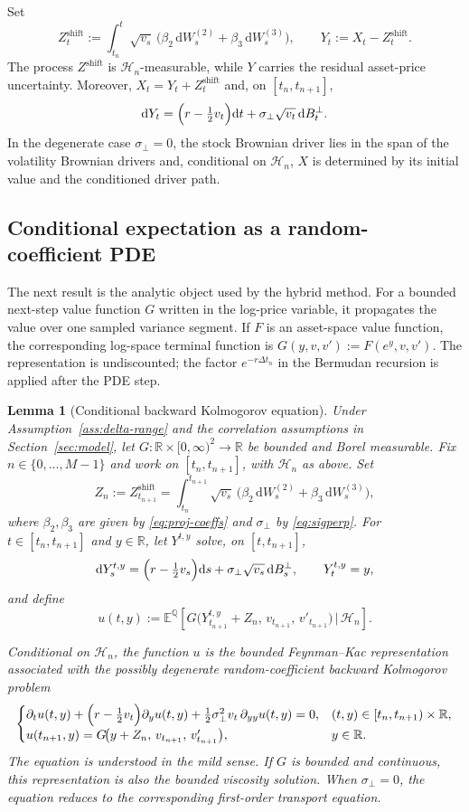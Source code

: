 \documentclass[10pt]{article}
\theoremstyle{plain}
\newtheorem{lemma}[theorem]{Lemma}
\theoremstyle{definition}
\theoremstyle{remark}
\newcommand{\dd}{\mathrm d}
\newcommand{\E}{\mathbb E}
\newcommand{\Q}{\mathbb Q}
\newcommand{\R}{\mathbb R}
\begin{document}
Set
\[
Z^{\mathrm{shift}}_t:=\int_{t_n}^t \sqrt{v_s}\,\bigl(\beta_2\,\dd W^{(2)}_s+\beta_3\,\dd W^{(3)}_s\bigr),
\qquad
Y_t:=X_t-Z^{\mathrm{shift}}_t.
\]
The process $Z^{\mathrm{shift}}$ is $\mathcal H_n$-measurable, while $Y$ carries the residual asset-price
uncertainty. Moreover, $X_t=Y_t+Z^{\mathrm{shift}}_t$ and, on $[t_n,t_{n+1}]$,
\[
\dd Y_t=\Bigl(r-\tfrac12 v_t\Bigr)\dd t+\sigma_\perp\sqrt{v_t}\,\dd B^\perp_t.
\]
In the degenerate case $\sigma_\perp=0$, the stock Brownian driver lies in the span of the
volatility Brownian drivers and, conditional on $\mathcal H_n$, $X$ is determined by its initial value and the
conditioned driver path.

\subsection{Conditional expectation as a random-coefficient PDE}

The next result is the analytic object used by the hybrid method. For a bounded next-step value function $G$
written in the log-price variable, it propagates the value over one sampled variance segment. If $F$ is an
asset-space value function, the corresponding log-space terminal function is $G(y,v,v'):=F(e^y,v,v')$. The
representation is undiscounted; the factor $e^{-r\Delta t_n}$ in the Bermudan recursion is applied after the PDE
step.

\begin{lemma}[Conditional backward Kolmogorov equation]\label{lem:cond-PDE}
Under Assumption~\ref{ass:delta-range} and the correlation assumptions in Section~\ref{sec:model}, let $G:\R\times[0,\infty)^2\to\R$ be bounded and Borel measurable.
Fix $n\in\{0,\dots,M-1\}$ and work on $[t_n,t_{n+1}]$, with $\mathcal H_n$ as above. Set
\[
Z_n := Z^{\mathrm{shift}}_{t_{n+1}}
= \int_{t_n}^{t_{n+1}} \sqrt{v_s}\,\bigl(\beta_2\,\dd W^{(2)}_s+\beta_3\,\dd W^{(3)}_s\bigr),
\]
where $\beta_2,\beta_3$ are given by \eqref{eq:proj-coeffs} and $\sigma_\perp$ by \eqref{eq:sigperp}.
For $t\in[t_n,t_{n+1}]$ and $y\in\R$, let $Y^{t,y}$ solve, on $[t,t_{n+1}]$,
\[
\dd Y^{t,y}_s
=\Bigl(r-\tfrac12 v_s\Bigr)\dd s+\sigma_\perp\sqrt{v_s}\,\dd B^\perp_s,
\qquad
Y^{t,y}_t=y,
\]
and define
\[
u(t,y)
:=
\E^\Q\!\left[
G\!\bigl(Y^{t,y}_{t_{n+1}}+Z_n,\,v_{t_{n+1}},\,v'_{t_{n+1}}\bigr)\,\Big|\,\mathcal H_n
\right].
\]

Conditional on $\mathcal H_n$, the function $u$ is the bounded Feynman--Kac representation associated with
the possibly degenerate random-coefficient backward Kolmogorov problem
\[
\begin{cases}
\partial_t u(t,y)+\Bigl(r-\tfrac12 v_t\Bigr)\partial_y u(t,y)
+\tfrac12\sigma_\perp^2 v_t\,\partial_{yy}u(t,y)=0,
& (t,y)\in[t_n,t_{n+1})\times\R,\\[2pt]
u(t_{n+1},y)=G\!\bigl(y+Z_n,\,v_{t_{n+1}},\,v'_{t_{n+1}}\bigr),
& y\in\R.
\end{cases}
\]
The equation is understood in the mild sense. If $G$ is bounded and continuous, this representation is also
the bounded viscosity solution. When $\sigma_\perp=0$, the equation reduces to the corresponding first-order
transport equation.
\end{lemma}
\end{document}
